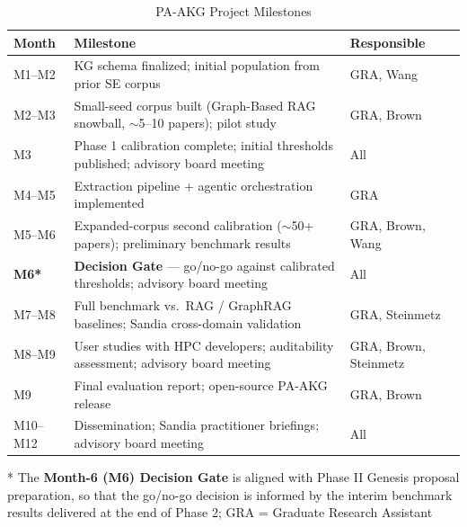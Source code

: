 
\begin{table}[t]
\centering
\footnotesize
\caption{PA-AKG Project Milestones}
\begin{tabular}{|l|l|l|}
\hline
\textbf{Month} & \textbf{Milestone} & \textbf{Responsible} \\ \hline
M1--M2 & KG schema finalized; initial population from prior SE corpus & GRA, Wang \\ \hline
M2--M3 & Small-seed corpus built (Graph-Based RAG snowball, $\sim$5--10 papers); pilot study & GRA, Brown \\ \hline
M3 & Phase 1 calibration complete; initial thresholds published; advisory board meeting & All \\ \hline
M4--M5 & Extraction pipeline + agentic orchestration implemented & GRA \\ \hline
M5--M6 & Expanded-corpus second calibration ($\sim$50+ papers); preliminary benchmark results & GRA, Brown, Wang \\ \hline
\textbf{M6*} & \textbf{Decision Gate} --- go/no-go against calibrated thresholds; advisory board meeting & All \\ \hline
M7--M8 & Full benchmark vs.\ RAG / GraphRAG baselines; Sandia cross-domain validation & GRA, Steinmetz \\ \hline
M8--M9 & User studies with HPC developers; auditability assessment; advisory board meeting & GRA, Brown, Steinmetz \\ \hline
M9 & Final evaluation report; open-source PA-AKG release & GRA, Brown \\ \hline
M10--M12 & Dissemination; Sandia practitioner briefings; advisory board meeting & All \\ \hline
\end{tabular}
\footnotesize{* The \textbf{Month-6 (M6) Decision Gate} is aligned with Phase II Genesis proposal preparation, so that the go/no-go decision is informed by the interim benchmark results delivered at the end of Phase 2; GRA = Graduate Research Assistant}
\label{tab:milestones}
\end{table}
